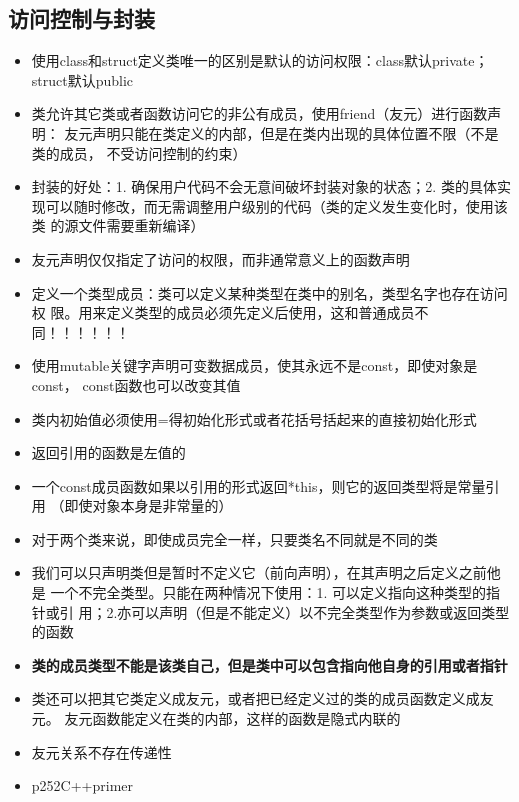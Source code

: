 \documentclass[11pt]{article}
\begin{document}
\subsection{访问控制与封装}
\label{sec-5-2}
\begin{itemize}
\item 使用class和struct定义类唯一的区别是默认的访问权限：class默认private；
struct默认public
\item 类允许其它类或者函数访问它的非公有成员，使用friend（友元）进行函数声明：
友元声明只能在类定义的内部，但是在类内出现的具体位置不限（不是类的成员，
不受访问控制的约束）
\item 封装的好处：1. 确保用户代码不会无意间破坏封装对象的状态；2. 类的具体实
现可以随时修改，而无需调整用户级别的代码（类的定义发生变化时，使用该类
的源文件需要重新编译）
\item 友元声明仅仅指定了访问的权限，而非通常意义上的函数声明
\item 定义一个类型成员：类可以定义某种类型在类中的别名，类型名字也存在访问权
限。用来定义类型的成员必须先定义后使用，这和普通成员不同！！！！！！
\item 使用mutable关键字声明可变数据成员，使其永远不是const，即使对象是const，
const函数也可以改变其值
\item 类内初始值必须使用=得初始化形式或者花括号括起来的直接初始化形式
\item 返回引用的函数是左值的
\item 一个const成员函数如果以引用的形式返回*this，则它的返回类型将是常量引用
（即使对象本身是非常量的）
\item 对于两个类来说，即使成员完全一样，只要类名不同就是不同的类
\item 我们可以只声明类但是暂时不定义它（前向声明），在其声明之后定义之前他是
一个不完全类型。只能在两种情况下使用：1. 可以定义指向这种类型的指针或引
用；2.亦可以声明（但是不能定义）以不完全类型作为参数或返回类型的函数
\item \textbf{类的成员类型不能是该类自己，但是类中可以包含指向他自身的引用或者指针}
\item 类还可以把其它类定义成友元，或者把已经定义过的类的成员函数定义成友元。
友元函数能定义在类的内部，这样的函数是隐式内联的
\item 友元关系不存在传递性
\item p252C++primer
\end{itemize}
\end{document}
